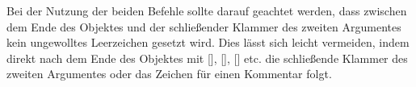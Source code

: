 \documentclass[%
  english,ngerman,%
  cdgeometry=no,DIV=12,automark%
]{tudscrartcl}
\begin{document}
Bei der Nutzung der beiden Befehle sollte darauf geachtet werden, dass zwischen 
dem Ende des Objektes und der schließender Klammer des zweiten Argumentes kein 
ungewolltes Leerzeichen gesetzt wird. Dies lässt sich leicht vermeiden, indem 
direkt nach dem Ende des Objektes mit [], 
[], [] etc. die 
schließende Klammer des zweiten Argumentes oder das Zeichen für einen Kommentar 
\PValue{\%} folgt.

\begin{table}
\end{table}
\end{document}
